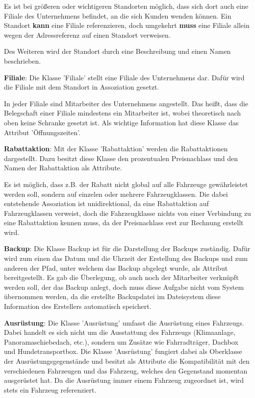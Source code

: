 Es ist bei größeren oder wichtigeren Standorten möglich, dass sich dort auch eine Filiale des Unternehmens befindet, an die sich Kunden wenden können. Ein Standort \textbf{kann} eine Filiale referenzieren, doch umgekehrt \textbf{muss} eine Filiale allein wegen der Adressreferenz auf einen Standort verweisen.

Des Weiteren wird der Standort durch eine Beschreibung und einen Namen beschrieben. 

\textbf{Filiale}: Die Klasse 'Filiale' stellt eine Filiale des Unternehmens dar. Dafür wird die Filiale mit dem Standort in Assoziation gesetzt.

In jeder Filiale sind Mitarbeiter des Unternehmens angestellt. Das heißt, dass die Belegschaft einer Filiale mindestens ein Mitarbeiter ist, wobei theoretisch nach oben keine Schranke gesetzt ist. Als wichtige Information hat diese Klasse das Attribut 'Öffnungszeiten'. 

\textbf{Rabattaktion}: Mit der Klasse 'Rabattaktion' werden die Rabattaktionen dargestellt. Dazu besitzt diese Klasse den prozentualen Preisnachlass und den Namen der Rabattaktion als Attribute. 

Es ist möglich, dass z.B. der Rabatt nicht global auf alle Fahrzeuge gewährleistet werden soll, sondern auf einzelen oder mehrere Fahrzeugklassen. Die dabei entstehende Assoziation ist unidirektional, da eine Rabattaktion auf Fahrzeugklassen verweist, doch die Fahrzeugklasse nichts von einer Verbindung zu eine Rabattaktion kennen muss, da der Preisnachlass erst zur Rechnung erstellt wird. 

\textbf{Backup}: Die Klasse Backup ist für die Darstellung der Backups zuständig. Dafür wird zum einen das Datum und die Uhrzeit der Erstellung des Backups und zum anderen der Pfad, unter welchem das Backup abgelegt wurde, als Attribut bereitgestellt. Es gab die Überlegung, ob auch noch der Mitarbeiter verknüpft werden soll, der das Backup anlegt, doch muss diese Aufgabe nicht vom System übernommen werden, da die erstellte Backupdatei im Dateisystem diese Information des Erstellers automatisch speichert. 

\textbf{Ausrüstung}: Die Klasse 'Ausrüstung' umfasst die Ausrüstung eines Fahrzeugs. Dabei handelt es sich nicht um die Ausstattung des Fahrzeugs (Klimaanlage, Panoramaschiebedach, etc.), sondern um Zusätze wie Fahrradträger, Dachbox und Hundetransportbox. Die Klasse 'Ausrüstung' fungiert dabei als Oberklasse der Ausrüstungsgegenstände und besitzt als Attribute die Kompatibilität mit den verschiedenen Fahrzeugen und das Fahrzeug, welches den Gegenstand momentan ausgerüstet hat. Da die Ausrüstung immer einem Fahrzeug zugeordnet ist, wird stets ein Fahrzeug referenziert.

